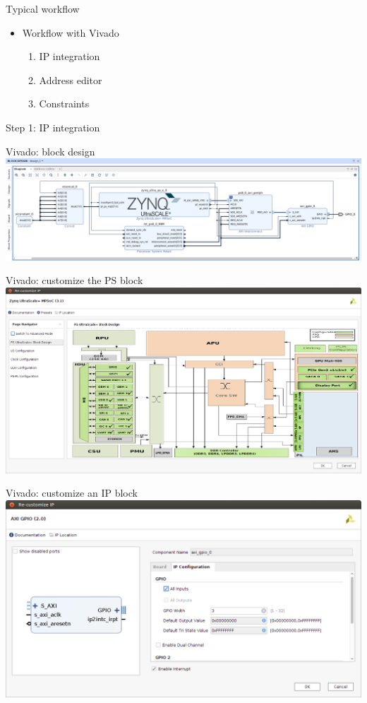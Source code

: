 \documentclass[xetex,table]{beamer}
\begin{document}
\begin{frame}{Typical workflow}
  \begin{itemize}
  \item Workflow with Vivado
    \begin{enumerate}
    \item IP integration
    \item Address editor
    \item Constraints
    \end{enumerate}
  \end{itemize}
\end{frame}

\begin{frame}[standout]
  Step 1: IP integration
\end{frame}

\begin{frame}{Vivado: block design}
  \center\includegraphics[width=1.0\textwidth]{images/block-design.png}
\end{frame}

\begin{frame}{Vivado: customize the PS block}
  \center\includegraphics[width=1.0\textwidth]{images/customize-ps.png}
\end{frame}

\begin{frame}{Vivado: customize an IP block}
  \center\includegraphics[width=1.0\textwidth]{images/customize-gpio.png}
\end{frame}
\end{document}
